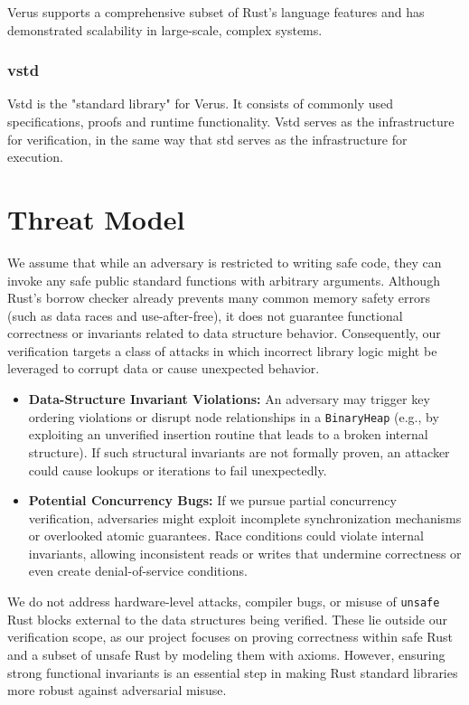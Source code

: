 \documentclass[conference]{IEEEtran}
\begin{document}
Verus supports a comprehensive subset of Rust's language features and has demonstrated scalability in large-scale, complex systems\cite{verus_publications}.

\subsubsection{vstd}
Vstd is the "standard library" for Verus. It consists of commonly used specifications, proofs and runtime functionality. Vstd serves as the infrastructure for verification, in the same way that std serves as the infrastructure for execution.     

\section{Threat Model}
We assume that while an adversary is restricted to writing safe code, they can invoke any safe public standard functions with arbitrary arguments. Although Rust's borrow checker already prevents many common memory safety errors (such as data races and use-after-free), it does not guarantee functional correctness or invariants related to data structure behavior. Consequently, our verification targets a class of attacks in which incorrect library logic might be leveraged to corrupt data or cause unexpected behavior.

\begin{itemize}
\item \textbf{Data-Structure Invariant Violations:} An adversary may trigger key ordering violations or disrupt node relationships in a \texttt{BinaryHeap} (e.g., by exploiting an unverified insertion routine that leads to a broken internal structure). If such structural invariants are not formally proven, an attacker could cause lookups or iterations to fail unexpectedly.
\item \textbf{Potential Concurrency Bugs:} If we pursue partial concurrency verification, adversaries might exploit incomplete synchronization mechanisms or overlooked atomic guarantees. Race conditions could violate internal invariants, allowing inconsistent reads or writes that undermine correctness or even create denial-of-service conditions.
\end{itemize}

We do not address hardware-level attacks, compiler bugs, or misuse of \texttt{unsafe} Rust blocks external to the data structures being verified. These lie outside our verification scope, as our project focuses on proving correctness within safe Rust and a subset of unsafe Rust by modeling them with axioms. However, ensuring strong functional invariants is an essential step in making Rust standard libraries more robust against adversarial misuse.
\end{document}
